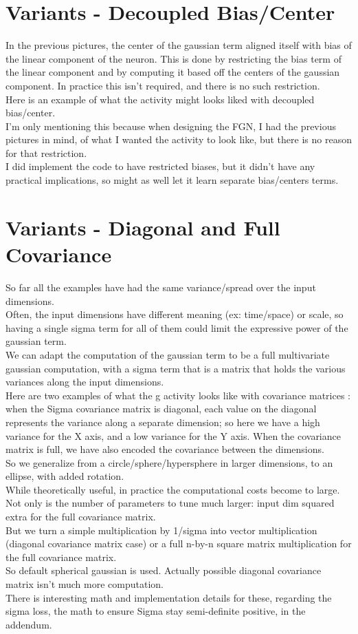 \documentclass{article}
\begin{document}
\section{Variants - Decoupled Bias/Center}
In the previous pictures, the center of the gaussian term aligned itself with bias of the linear component of the neuron. This is done by restricting the bias term of the linear component and by computing it based off the centers of the gaussian component.  In practice this isn't required, and there is no such restriction.\\
Here is an example of what the activity might looks liked with decoupled bias/center.\\
I'm only mentioning this because when designing the FGN, I had the previous pictures in mind, of what I wanted the activity to look like, but there is no reason for that restriction. \\
I did implement the code to have restricted biases, but it didn't have any practical implications, so might as well let it learn separate bias/centers terms. 

\section{Variants - Diagonal and Full Covariance}
So far all the examples have had the same variance/spread over the input dimensions. \\
Often, the input dimensions have different meaning (ex: time/space) or scale, so having a single sigma term for all of them could limit the expressive power of the gaussian term.\\
We can adapt the computation of the gaussian term to be a full multivariate gaussian computation, with a sigma term that is a matrix that holds the various variances along the input dimensions.\\
Here are two examples of what the g activity looks like with covariance matrices : when the Sigma covariance matrix is diagonal, each value on the diagonal represents the variance along a separate dimension; so here we have a high variance for the X axis, and a low variance for the Y axis. When the covariance matrix is full, we have also encoded the covariance between the dimensions.\\
So we generalize from a circle/sphere/hypersphere in larger dimensions, to an ellipse, with added rotation.\\
While theoretically useful, in practice the computational costs become to large.\\
Not only is the number of parameters to tune much larger: input dim squared extra for the full covariance matrix.\\
But we turn a simple multiplication by 1/sigma into vector multiplication (diagonal covariance matrix case) or a full n-by-n square matrix multiplication for the full covariance matrix.\\
So default spherical gaussian is  used. Actually possible diagonal covariance matrix isn't much more computation.\\
There is interesting math and implementation details for these, regarding the sigma loss, the math to ensure Sigma stay semi-definite positive, in the addendum. 
\end{document}
